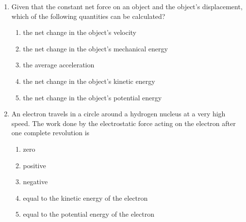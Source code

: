 \documentclass{../../../oss-legalpaper}
\begin{document}
\begin{multicols}{2}
\begin{enumerate}[leftmargin=18pt,resume]
  \item Given that the constant net force on an object and the object's 
    displacement, which of the following quantities can be calculated?
    \begin{enumerate}[noitemsep,topsep=0pt,leftmargin=18pt,label=(\Alph*)]
    \item the net change in the object's velocity
    \item the net change in the object's mechanical energy
    \item the average acceleration
    \item the net change in the object's kinetic energy
    \item the net change in the object's potential energy
    \end{enumerate}
    
  \item An electron travels in a circle around a hydrogen nucleus at a very high
    speed. The work done by the electrostatic force acting on the electron
    after one complete revolution is
    \begin{enumerate}[noitemsep,topsep=0pt,leftmargin=18pt,label=(\Alph*)]
    \item zero
    \item positive
    \item negative
    \item equal to the kinetic energy of the electron
    \item equal to the potential energy of the electron
    \end{enumerate}


\end{enumerate}
\end{multicols}
\end{document}
